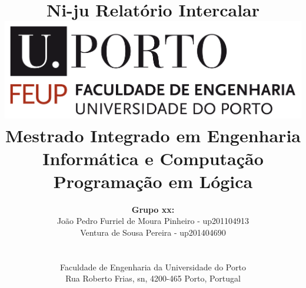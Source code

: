 \documentclass[a4paper]{article}
\begin{document}
\setlength{\textwidth}{16cm}
\setlength{\textheight}{22cm}

\title{\Huge\textbf{Ni-ju}\linebreak\linebreak\linebreak
\Large\textbf{Relatório Intercalar}\linebreak\linebreak
\linebreak\linebreak
\includegraphics[scale=0.1]{../printscreens/feup-logo.png}\linebreak\linebreak
\linebreak\linebreak
\Large{Mestrado Integrado em Engenharia Informática e Computação} \linebreak\linebreak
\Large{Programação em Lógica}\linebreak
}

\author{\textbf{Grupo xx:}\\
João Pedro Furriel de Moura Pinheiro - up201104913\\
Ventura de Sousa Pereira - up201404690\\
\linebreak\linebreak \\
 \\ Faculdade de Engenharia da Universidade do Porto \\ Rua Roberto Frias, s\/n, 4200-465 Porto, Portugal \linebreak\linebreak\linebreak
\linebreak\linebreak\vspace{1cm}}

\maketitle
\thispagestyle{empty}
\end{document}

